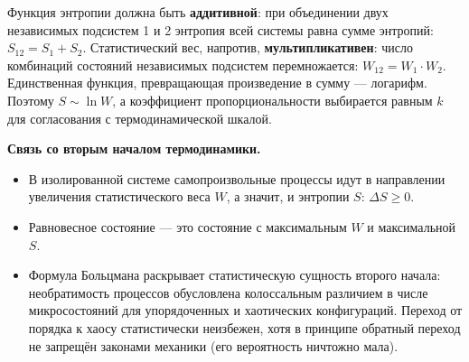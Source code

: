 \begin{property}
Функция энтропии должна быть \textbf{аддитивной}: при объединении двух независимых подсистем 1 и 2 энтропия всей системы равна сумме энтропий: $S_{12} = S_1 + S_2$.
Статистический вес, напротив, \textbf{мультипликативен}: число комбинаций состояний независимых подсистем перемножается: $W_{12} = W_1 \cdot W_2$.
Единственная функция, превращающая произведение в сумму --- логарифм. Поэтому $S \sim \ln W$, а коэффициент пропорциональности выбирается равным $k$ для согласования с термодинамической шкалой.
\end{property}

\begin{remark}
\textbf{Связь со вторым началом термодинамики.}
\begin{itemize}
    \item В изолированной системе самопроизвольные процессы идут в направлении увеличения статистического веса $W$, а значит, и энтропии $S$: $\Delta S \ge 0$.
    \item Равновесное состояние --- это состояние с максимальным $W$ и максимальной $S$.
    \item Формула Больцмана раскрывает статистическую сущность второго начала: необратимость процессов обусловлена колоссальным различием в числе микросостояний для упорядоченных и хаотических конфигураций. Переход от порядка к хаосу статистически неизбежен, хотя в принципе обратный переход не запрещён законами механики (его вероятность ничтожно мала).
\end{itemize}
\end{remark}
